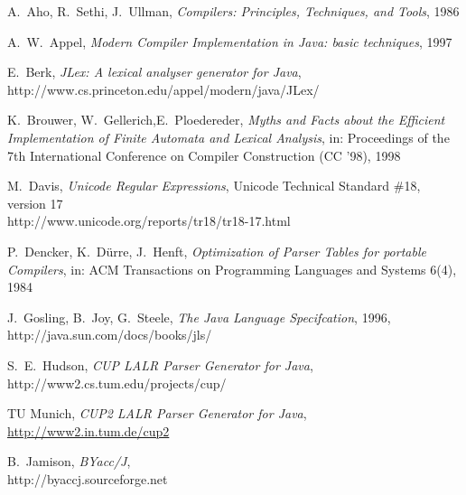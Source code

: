 \documentclass[11pt]{scrartcl}
\newcommand{\trit}{\em}
\begin{document}
\newpage  
\begin{thebibliography}{[00]} 
\label{References} 

  A.~Aho, R.~Sethi, J.~Ullman, {\trit Compilers: Principles, Techniques, and Tools}, 1986


  A.~W.~Appel, {\trit Modern Compiler Implementation in Java: basic techniques}, 1997

 E.~Berk, {\trit JLex: A lexical analyser generator for Java},\\
                   {http://www.cs.princeton.edu/appel/modern/java/JLex/}


  K.~Brouwer, W.~Gellerich,E.~Ploedereder, 
  {\trit Myths and Facts about the Efficient Implementation of Finite Automata and Lexical Analysis}, 
  in: Proceedings of the 7th International Conference on Compiler Construction (CC '98), 1998

  M.~Davis, {\trit Unicode Regular Expressions}, Unicode Technical Standard \#18, version 17\\ 
                    {http://www.unicode.org/reports/tr18/tr18-17.html}

 P.~Dencker, K.~D{\"u}rre, J.~Henft, {\trit Optimization of Parser Tables for portable Compilers}, 
 in: ACM Transactions on Programming Languages and Systems 6(4), 1984

  J.~Gosling, B.~Joy, G.~Steele, {\trit The Java Language Specifcation}, 1996,\\
                    {http://java.sun.com/docs/books/jls/}

  S.~E.~Hudson, {\trit CUP LALR Parser Generator for Java},\\  
  {http://www2.cs.tum.edu/projects/cup/}

  TU Munich, {\trit CUP2 LALR Parser Generator for Java},\\
  \url{http://www2.in.tum.de/cup2}

  B.~Jamison, {\trit BYacc/J},\\
  {http://byaccj.sourceforge.net}


\end{thebibliography}
\end{document}

